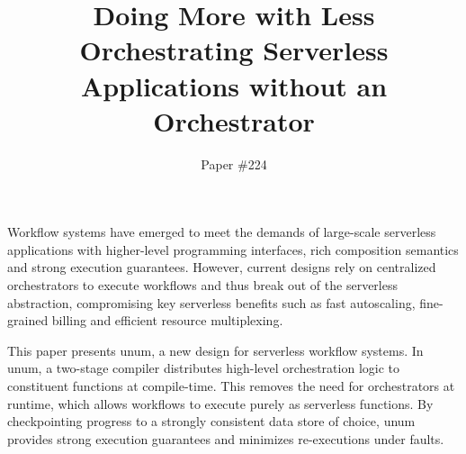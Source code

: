 \documentclass[letterpaper,twocolumn,10pt]{article}
\newcommand{\name}{unum}
\begin{document}

\date{}

\title{Doing More with Less \\ Orchestrating Serverless Applications
without an Orchestrator}

\author{
  Paper \#224
} %

\maketitle
\thispagestyle{empty}

\abstract

Workflow systems have emerged to meet the demands of large-scale serverless
applications with higher-level programming interfaces, rich composition
semantics and strong execution guarantees. However, current designs rely on
centralized orchestrators to execute workflows and thus break out of
the serverless abstraction, compromising key serverless benefits such as fast
autoscaling, fine-grained billing and efficient resource multiplexing. 

This paper presents \name{}, a new design for serverless workflow systems. 
In \name{}, a two-stage compiler distributes high-level orchestration
logic to constituent functions at compile-time. 
This removes the need for orchestrators at runtime, which allows workflows to 
execute purely as serverless functions. 
By checkpointing progress to a strongly consistent data store 
of choice, \name{} provides strong execution guarantees 
and minimizes re-executions under faults. 
\end{document}
